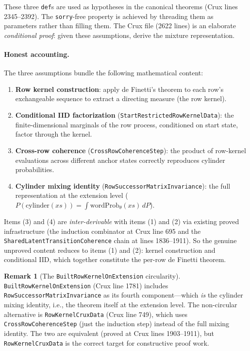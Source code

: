 \documentclass[11pt]{article}
\theoremstyle{definition}
\newtheorem{remark}[theorem]{Remark}
\newcommand{\lean}[1]{\texttt{#1}}
\begin{document}
These three \lean{def}s are used as hypotheses in the canonical
theorems (Crux lines 2345--2392).  The \lean{sorry}-free property is
achieved by threading them as parameters rather than filling them.
The Crux file (2622 lines) is an elaborate \emph{conditional proof}:
given these assumptions, derive the mixture representation.

\paragraph{Honest accounting.}  The three assumptions bundle the
following mathematical content:
\begin{enumerate}[leftmargin=2em]
\item \textbf{Row kernel construction}: apply de Finetti's theorem
  to each row's exchangeable sequence to extract a directing measure
  (the row kernel).
\item \textbf{Conditional IID factorization}
  (\lean{StartRestrictedRowKernelData}): the finite-dimensional
  marginals of the row process, conditioned on start state, factor
  through the kernel.
\item \textbf{Cross-row coherence}
  (\lean{CrossRowCoherenceStep}): the product of row-kernel evaluations
  across different anchor states correctly reproduces cylinder
  probabilities.
\item \textbf{Cylinder mixing identity}
  (\lean{RowSuccessorMatrixInvariance}): the full representation
  at the extension level ($P(\mathrm{cylinder}(xs)) =
  \int \mathrm{wordProb}_\theta(xs)\, dP$).
\end{enumerate}

Items (3) and (4) are \emph{inter-derivable} with items (1) and (2)
via existing proved infrastructure (the induction combinator at Crux
line 695 and the \lean{SharedLatentTransitionCoherence} chain at
lines 1836--1911).  So the genuine unproved content reduces to items
(1) and (2): kernel construction and conditional IID, which together
constitute the per-row de Finetti theorem.

\begin{remark}[The \lean{BuiltRowKernelOnExtension} circularity]
\lean{BuiltRowKernelOnExtension} (Crux line 1781) includes
\lean{RowSuccessorMatrixInvariance} as its fourth component---which
\emph{is} the cylinder mixing identity, i.e., the theorem itself at
the extension level.  The non-circular alternative is
\lean{RowKernelCruxData} (Crux line 749), which uses
\lean{CrossRowCoherenceStep} (just the induction step) instead of
the full mixing identity.  The two are equivalent (proved at Crux
lines 1903--1911), but \lean{RowKernelCruxData} is the correct
target for constructive proof work.
\end{remark}
\end{document}
